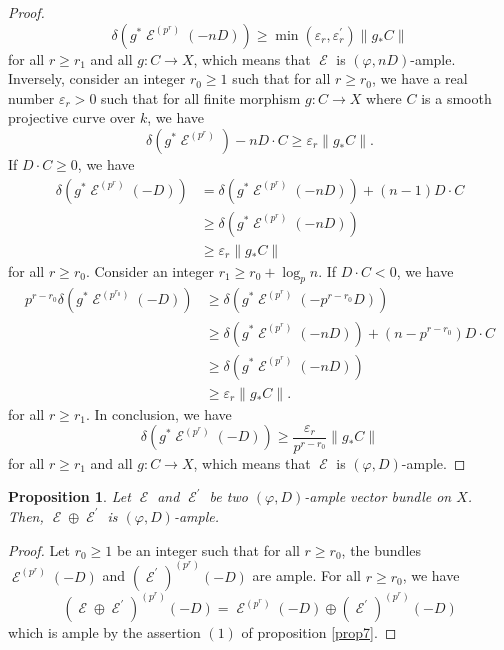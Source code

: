 \documentclass[11pt]{amsart}
\numberwithin{subsection}{section}
\numberwithin{figure}{section}
\numberwithin{table}{section}
\theoremstyle{1}
\newtheorem{proposition}[theorem]{Proposition}
\theoremstyle{2}
\DeclareMathOperator{\E}{\mathcal{E}}
\begin{document}
\begin{proof}
\begin{equation*}
\delta(g^*\E^{(p^r)}(-nD)) \geq \min(\varepsilon_r,\varepsilon_r^\prime) \lVert g_*C \rVert
\end{equation*}
for all $r \geq r_1$ and all $g : C \rightarrow X$, which means that $\E$ is $(\varphi,nD)$-ample. Inversely, consider an integer $r_0 \geq 1$ such that for all $r \geq r_0$, we have a real number $\varepsilon_r > 0$ such that for all finite morphism $g : C \rightarrow X$ where $C$ is a smooth projective curve over $k$, we have
\begin{equation*}
\delta(g^*\E^{(p^r)}) -nD\cdot C \geq \varepsilon_r\lVert g_*C \rVert.
\end{equation*}
If $D\cdot C\geq 0$, we have 
\begin{equation*}
\begin{aligned}
\delta(g^*\E^{(p^r)}(-D)) &= \delta(g^*\E^{(p^r)}(-nD)) +(n-1)D\cdot C \\
&\geq \delta(g^*\E^{(p^r)}(-nD)) \\
&\geq \varepsilon_r\lVert g_*C \rVert
\end{aligned}
\end{equation*}
for all $r\geq r_0$.
Consider an integer $r_1 \geq r_0 + \log_pn$. If $D\cdot C< 0$, we have 
\begin{equation*}
\begin{aligned}
p^{r-r_0}\delta(g^*\E^{(p^{r_0})}(-D)) &\geq \delta(g^*\E^{(p^r)}(-p^{r-r_0}D)) \\
&\geq \delta(g^*\E^{(p^r)}(-nD)) + (n-p^{r-r_0})D\cdot C \\
&\geq \delta(g^*\E^{(p^r)}(-nD)) \\
&\geq \varepsilon_r\lVert g_*C \rVert.
\end{aligned}
\end{equation*}
for all $r \geq r_1$. In conclusion, we have
\begin{equation*}
\delta(g^*\E^{(p^r)}(-D)) \geq \frac{\varepsilon_r}{p^{r-r_0}} \lVert g_*C \rVert
\end{equation*}
for all $r \geq r_1$ and all $g : C \rightarrow X$, which means that $\E$ is $(\varphi,D)$-ample.
\end{proof}
\begin{proposition}\label{prop15}
Let $\E$ and $\E^\prime$ be two $(\varphi,D)$-ample vector bundle on $X$. Then, $\E \oplus \E^\prime$ is $(\varphi,D)$-ample.
\end{proposition}
\begin{proof}
Let $r_0 \geq 1$ be an integer such that for all $r \geq r_0$, the bundles $\E^{(p^r)}(-D)$ and ${(\E^\prime)}^{(p^r)}(-D)$ are ample. For all $r \geq r_0$, we have
\begin{equation*}
(\E \oplus \E^{\prime})^{(p^r)}(-D) = \E^{(p^r)}(-D) \oplus {(\E^\prime)}^{(p^r)}(-D)
\end{equation*}
which is ample by the assertion $(1)$ of proposition \ref{prop7}.
\end{proof}
\end{document}
